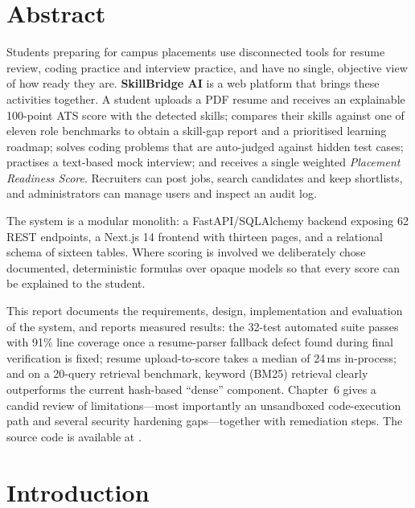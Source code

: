 \documentclass[openany]{tietreport}
\author{%
  \texttt{1024030168} Uday Dhir \\
  \texttt{1024030170} Aishwarya Verma%
}
\begin{document}
\maketitle
\tableofcontents

\chapter*{Abstract}
Students preparing for campus placements use disconnected tools for resume review, coding practice and interview practice, and have no single, objective view of how ready they are. \textbf{SkillBridge AI} is a web platform that brings these activities together. A student uploads a PDF resume and receives an explainable 100-point ATS score with the detected skills; compares their skills against one of eleven role benchmarks to obtain a skill-gap report and a prioritised learning roadmap; solves coding problems that are auto-judged against hidden test cases; practises a text-based mock interview; and receives a single weighted \emph{Placement Readiness Score}. Recruiters can post jobs, search candidates and keep shortlists, and administrators can manage users and inspect an audit log.

The system is a modular monolith: a FastAPI/SQLAlchemy backend exposing 62 REST endpoints, a Next.js 14 frontend with thirteen pages, and a relational schema of sixteen tables. Where scoring is involved we deliberately chose documented, deterministic formulas over opaque models so that every score can be explained to the student.

This report documents the requirements, design, implementation and evaluation of the system, and reports measured results: the 32-test automated suite passes with 91\% line coverage once a resume-parser fallback defect found during final verification is fixed; resume upload-to-score takes a median of 24\,ms in-process; and on a 20-query retrieval benchmark, keyword (BM25) retrieval clearly outperforms the current hash-based ``dense'' component. Chapter~6 gives a candid review of limitations---most importantly an unsandboxed code-execution path and several security hardening gaps---together with remediation steps. The source code is available at \cite{repo}.

\chapter{Introduction}
\end{document}
